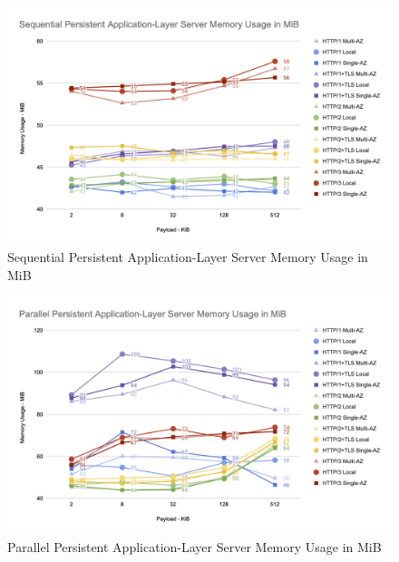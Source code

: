 \begin{figure}[h!]
    \centering
    \includegraphics[width=\linewidth]{figures/charts/Sequential Persistent Application-Layer Server Memory Usage in MiB.png}
    \caption{Sequential Persistent Application-Layer Server Memory Usage in MiB}
    \label{fig:sequential_server_app_memory}
\end{figure}
\begin{figure}[h!]
    \centering
    \includegraphics[width=\linewidth]{figures/charts/Parallel Persistent Application-Layer Server Memory Usage in MiB.png}
    \caption{Parallel Persistent Application-Layer Server Memory Usage in MiB}
    \label{fig:parallel_server_app_memory}
\end{figure}
